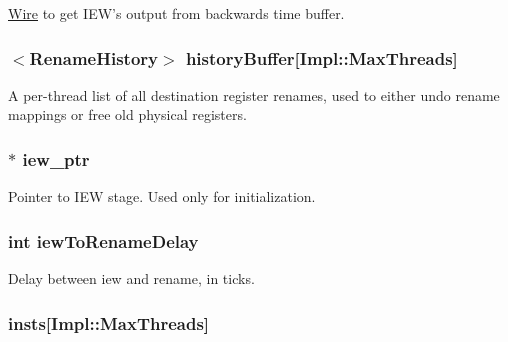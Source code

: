 \label{classDefaultRename_a6c9093e88770a58dc8853f49a09bbac8}
\hyperlink{classWire}{Wire} to get IEW's output from backwards time buffer. \hypertarget{classDefaultRename_adc01dc05e6459841df629cb3353ddde9}{
\subsubsection[{historyBuffer}]{$<${\bf RenameHistory}$>$ {\bf historyBuffer}\mbox{[}Impl::MaxThreads\mbox{]}}}
\label{classDefaultRename_adc01dc05e6459841df629cb3353ddde9}
A per-\/thread list of all destination register renames, used to either undo rename mappings or free old physical registers. \hypertarget{classDefaultRename_abf7286da8e826739b29fa67855f4216b}{
\subsubsection[{iew\_\-ptr}]{$\ast$ {\bf iew\_\-ptr}}}
\label{classDefaultRename_abf7286da8e826739b29fa67855f4216b}
Pointer to IEW stage. Used only for initialization. \hypertarget{classDefaultRename_a3069f8fd673d0e9ea2b1a8ce0ad3fe06}{
\subsubsection[{iewToRenameDelay}]{\setlength{\rightskip}{0pt plus 5cm}int {\bf iewToRenameDelay}}}
\label{classDefaultRename_a3069f8fd673d0e9ea2b1a8ce0ad3fe06}
Delay between iew and rename, in ticks. \hypertarget{classDefaultRename_a4b6cd9f78efe8b5101b48dbf35a43c11}{
\subsubsection[{insts}]{ {\bf insts}\mbox{[}Impl::MaxThreads\mbox{]}}}

